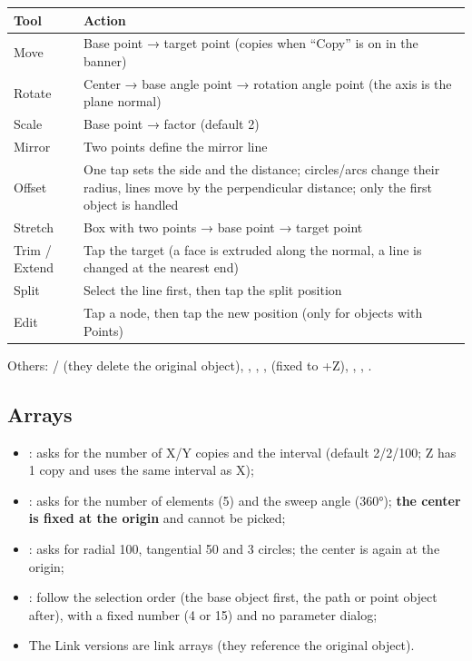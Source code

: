 \begin{center}
\small
\begin{tabularx}{\linewidth}{@{}lX@{}}
\toprule
\textbf{Tool} & \textbf{Action} \\
\midrule
Move & Base point → target point (copies when ``Copy'' is on in the banner)\\
Rotate & Center → base angle point → rotation angle point (the axis is the plane normal)\\
Scale & Base point → factor (default 2)\\
Mirror & Two points define the mirror line \\
Offset & One tap sets the side and the distance; circles/arcs change their radius, lines move by the perpendicular distance; only the first object is handled \\
Stretch & Box with two points → base point → target point \\
Trim / Extend & Tap the target (a face is extruded along the normal, a line is changed at the nearest end)\\
Split & Select the line first, then tap the split position \\
Edit & Tap a node, then tap the new position (only for objects with Points)\\
\bottomrule
\end{tabularx}
\end{center}

Others: / (they delete the original object), , , ,  (fixed to +Z), , , .

\subsection{Arrays}

\begin{itemize}
  \item {}: asks for the number of X/Y copies and the interval (default
        2/2/100; Z has 1 copy and uses the same interval as X);
  \item {}: asks for the number of elements (5) and the sweep angle (360°);
        \textbf{the center is fixed at the origin} and cannot be picked;
  \item {}: asks for radial 100, tangential 50 and 3 circles; the center is again at
        the origin;
  \item {}: follow the selection order (the base
        object first, the path or point object after), with a fixed number (4 or 15) and no
        parameter dialog;
  \item The Link versions are link arrays (they reference the original object).
\end{itemize}

